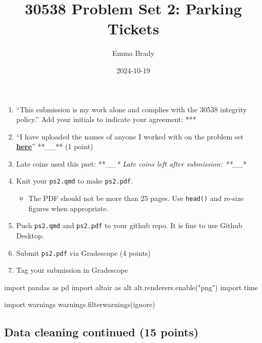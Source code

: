 \documentclass[
]{article}
\title{30538 Problem Set 2: Parking Tickets}
\author{Emma Brady}
\date{2024-10-19}
\newenvironment{Shaded}{\begin{snugshade}}{\end{snugshade}}
\newcommand{\ImportTok}[1]{\textcolor[rgb]{0.00,0.46,0.62}{#1}}
\newcommand{\NormalTok}[1]{\textcolor[rgb]{0.00,0.23,0.31}{#1}}
\newcommand{\StringTok}[1]{\textcolor[rgb]{0.13,0.47,0.30}{#1}}
\providecommand{\tightlist}{%
  \setlength{\itemsep}{0pt}\setlength{\parskip}{0pt}}\usepackage{longtable,booktabs,array}
\begin{document}
\maketitle


\begin{enumerate}
\def\labelenumi{\arabic{enumi}.}
\tightlist
\item
  ``This submission is my work alone and complies with the 30538
  integrity policy.'' Add your initials to indicate your agreement:
  **\E\B**
\item
  ``I have uploaded the names of anyone I worked with on the problem set
  \textbf{\href{https://docs.google.com/forms/d/1-zzHx762odGlpVWtgdIC55vqF-j3gqdAp6Pno1rIGK0/edit}{here}}''
  **\_\_** (1 point)
\item
  Late coins used this pset: **\_\_\emph{* Late coins left after
  submission: **\_\_}*
\item
  Knit your \texttt{ps2.qmd} to make \texttt{ps2.pdf}.

  \begin{itemize}
  \tightlist
  \item
    The PDF should not be more than 25 pages. Use \texttt{head()} and
    re-size figures when appropriate.
  \end{itemize}
\item
  Push \texttt{ps2.qmd} and \texttt{ps2.pdf} to your github repo. It is
  fine to use Github Desktop.
\item
  Submit \texttt{ps2.pdf} via Gradescope (4 points)
\item
  Tag your submission in Gradescope
\end{enumerate}

\begin{Shaded}
\begin{Highlighting}[]
\ImportTok{import}\NormalTok{ pandas }\ImportTok{as}\NormalTok{ pd}
\ImportTok{import}\NormalTok{ altair }\ImportTok{as}\NormalTok{ alt}
\NormalTok{alt.renderers.enable(}\StringTok{"png"}\NormalTok{)}
\ImportTok{import}\NormalTok{ time}

\ImportTok{import}\NormalTok{ warnings }
\NormalTok{warnings.filterwarnings(}\StringTok{\textquotesingle{}ignore\textquotesingle{}}\NormalTok{)}
\end{Highlighting}
\end{Shaded}

\subsection{Data cleaning continued (15
points)}\label{data-cleaning-continued-15-points}
\end{document}
